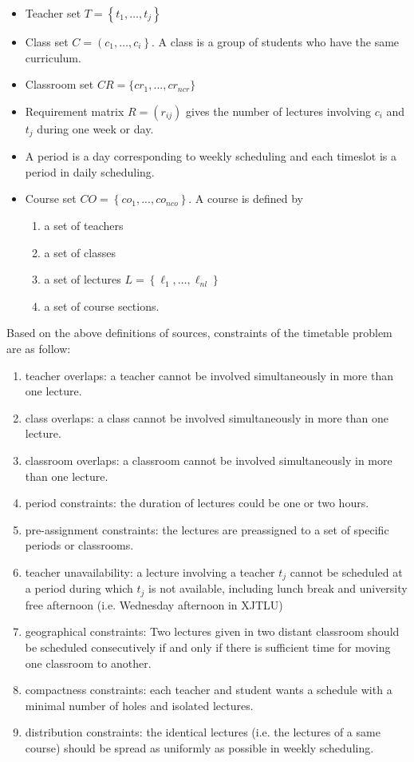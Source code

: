 \documentclass{article}
\begin{document}
\begin{itemize}
	\item Teacher set $T=\left\{t_{1}, \ldots, t_{j}\right\}$
	\item Class set $C=\left(c_{1}, \ldots, c_{i}\right\}$. A class is a group of students who have the same curriculum.
	\item Classroom set $CR=\{cr_{1},...,cr_{ncr}\}$
	\item Requirement matrix $R=(r_{ij})$ gives the number of lectures involving $c_i$ and $t_j$ during one week or day.
	\item A period is a day corresponding to weekly scheduling and each timeslot is a period in daily scheduling.
	\item Course set $CO=\left\{co_{1}, ... , co_{nco}\right\}$. A course is defined by
	      \begin{enumerate}
		      \item a set of teachers
		      \item a set of classes
		      \item a set of lectures $L=\left\{\ell_{1}, \ldots, \ell_{n l}\right\}$
		      \item a set of course sections.
	      \end{enumerate}
\end{itemize}
Based on the above definitions of sources, constraints of the timetable problem are as follow:
\begin{enumerate}
	\item teacher overlaps: a teacher cannot be involved simultaneously in more than one lecture.
	\item class overlaps: a class cannot be involved simultaneously in more than one lecture.
	\item classroom overlaps: a classroom cannot be involved simultaneously in more than one lecture.
	\item period constraints: the duration of lectures could be one or two hours.
	\item pre-assignment constraints: the lectures are preassigned to a set of specific periods or classrooms.
	\item teacher unavailability: a lecture involving a teacher $t_{j}$ cannot be scheduled at a period during which $t_{j}$ is not available, including lunch break and university free afternoon (i.e. Wednesday afternoon in XJTLU)
	\item  geographical constraints: Two lectures given in two distant classroom should be scheduled consecutively if and only if there is sufficient time for moving one classroom to another.
	\item  compactness constraints: each teacher and student wants a schedule with a minimal number of holes and isolated lectures.
	\item  distribution constraints: the identical lectures (i.e. the lectures of a same course) should be spread as uniformly as possible in weekly scheduling.
\end{enumerate}
\end{document}
